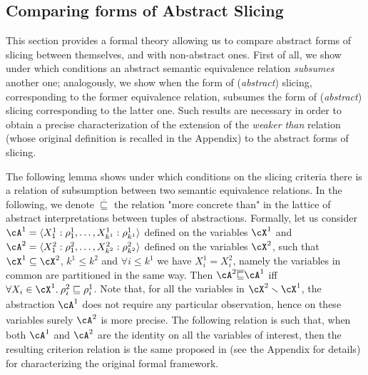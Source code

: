 \documentclass[prodmode,acmtocl]{acmsmall}
\def\uco{\ensuremath{\rho}\xspace}
\def\ok#1{\mbox{\raisebox{0ex}[1ex][1ex]{$#1$}}}
\newcommand{\COMMENT} [1]{}
\def\tuple#1{\langle #1 \rangle}
\newcommand{\0}{\mbox{\bf 0}}
\def\ok#1{\mbox{\raisebox{0ex}[1ex][1ex]{$#1$}}}
\begin{document}
\subsection{Comparing forms of Abstract Slicing}
\label{subsection:Comparing}
This section provides a formal theory allowing us to compare abstract
forms of slicing between themselves, and with non-abstract ones.
First of all, we show under which conditions an abstract semantic
equivalence relation \emph{subsumes} another one; analogously, we show
when the form of (\emph{abstract}) slicing, corresponding to the
former equivalence relation, subsumes the form of (\emph{abstract})
slicing corresponding to the latter one.  Such results are necessary
in order to obtain a precise characterization of the extension of the
\emph{weaker than} relation (whose original definition is recalled in
the Appendix) to the abstract forms of slicing.

\COMMENT{
  \begin{figure}[tbp]
    \centering
    \texttt{[image: SlicingTutto1.pdf]}
    \caption{ \label{fig:SlcTto}}
  \end{figure}}

The following lemma shows under which conditions on the slicing
criteria there is a relation of subsumption between two semantic
equivalence relations. In the following, we denote
$\overline{\sqsubseteq}$ the relation "more concrete than" in the
lattice of abstract interpretations between tuples of abstractions.
Formally, let us consider
$\cA^1=\tuple{X_1^1:\uco_1^1,\ldots,X_{k^1}^1:\uco_{k^1}^1}$ defined
on the variables $\cX^1$ and
$\cA^2=\tuple{X_1^2:\uco_1^2,\ldots,X_{k^2}^2:\uco_{k^2}^2}$ defined
on the variables $\cX^2$, such that $\cX^1\subseteq\cX^2$, $k^1\leq
k^2$ and $\forall i\leq k^1$ we have $X^1_i=X^2_i$, namely the
variables in common are partitioned in the same way.  Then
$\cA^{2}\overline{\sqsubseteq}\cA^{1}$ iff $\forall
X_i\in\cX^1.\:\uco_i^2\sqsubseteq\uco^1_i$. Note that, for all the
variables in $\ok{\cX^2\smallsetminus\cX^1}$, the abstraction
$\ok{\cA^1}$ does not require any particular observation, hence on
these variables surely $\ok{\cA^2}$ is more precise. The following
relation is such that, when both $\cA^1$ and $\cA^2$ are the identity
on all the variables of interest, then the resulting criterion
relation is the same proposed in \cite{TheoFoun} (see the Appendix for
details) for characterizing the original formal framework.
\end{document}
